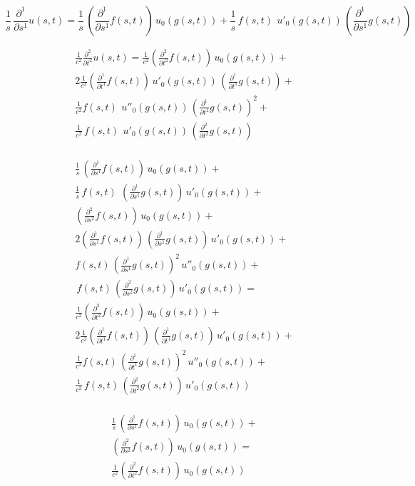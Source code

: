 \documentclass[amsmath,amssymb,floatfix]{revtex4}
\numberwithin{equation}{section}
\newcommand{\pd}[2]{\frac{ \partial ^ #2}{ \partial #1 ^ #2}  }
\begin{document}
\begin{equation*}
	\frac{1}{s} \, \pd{s}{1} u{(s,t)} =
	\frac{1}{s} \, \left( \pd{s}{1} f(s,t) \right) \,  u_0(g(s,t)) + 
	  \frac{1}{s} \, f(s,t) \ \, u'_0(g(s,t)) \, \left( \pd{s}{1} g(s,t)\right)	  
\end{equation*}

\begin{eqnarray*}	  
	\frac{1}{c^2}\pd{t}{2} u{(s,t)} =
	\frac{1}{c^2} \left( \pd{t}{2} f(s,t) \right) \,  u_0(g(s,t)) + \\
	 2 \frac{1}{c^2}\left( \pd{t}{1} f(s,t) \right)  \, u'_0(g(s,t)) \, \left( \pd{t}{1} g(s,t)\right) + \\
	  \frac{1}{c^2} f(s,t) \ \, u''_0(g(s,t)) \, \left( \pd{t}{1} g(s,t)\right)^2 + \\
		\frac{1}{c^2}\, f(s,t) \ \, u'_0(g(s,t)) \, \left( \pd{t}{2} g(s,t)\right) \\
\end{eqnarray*}




\begin{eqnarray*}	 
	\frac{1}{s} \, \left( \pd{s}{1} f(s,t) \right) \,  u_0(g(s,t)) +  \\
	  \frac{1}{s} \, f(s,t) \  \, \left( \pd{s}{1} g(s,t)\right) \, u'_0(g(s,t)) + \\ 
	 \left( \pd{s}{2} f(s,t) \right) \,  u_0(g(s,t)) + \\
	 2 \left( \pd{s}{1} f(s,t) \right) \, \left( \pd{s}{1} g(s,t)\right)  \, u'_0(g(s,t)) + \\
	   f(s,t)  \, \left( \pd{s}{1} g(s,t)\right)^2 \, u''_0(g(s,t)) + \\
		\, f(s,t)  \, \left( \pd{s}{2} g(s,t)\right) \, u'_0(g(s,t)) =  \\  
	\frac{1}{c^2} \left( \pd{t}{2} f(s,t) \right) \,  u_0(g(s,t)) + \\
	 2 \frac{1}{c^2}\left( \pd{t}{1} f(s,t) \right)   \, \left( \pd{t}{1} g(s,t)\right) \, u'_0(g(s,t)) + \\
	  \frac{1}{c^2} f(s,t)  \, \left( \pd{t}{1} g(s,t)\right)^2 \, u''_0(g(s,t)) + \\
		\frac{1}{c^2}\, f(s,t)  \, \left( \pd{t}{2} g(s,t)\right) \, u'_0(g(s,t)) \\
\end{eqnarray*}

\begin{eqnarray*}	 
	\frac{1}{s} \, \left( \pd{s}{1} f(s,t) \right) \,  u_0(g(s,t)) +  \\
	 \left( \pd{s}{2} f(s,t) \right) \,  u_0(g(s,t))  =  \\  
	\frac{1}{c^2} \left( \pd{t}{2} f(s,t) \right) \,  u_0(g(s,t))  \\
\end{eqnarray*}
\end{document}
